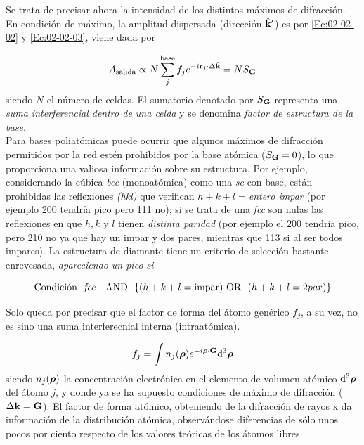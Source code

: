 Se trata de precisar ahora la intensidad de los distintos máximos de difracción. En condición de máximo, la amplitud dispersada (dirección $\hat{\mathbf{k}}'$) es por \ref{Ec:02-02-02} y \ref{Ec:02-02-03}, viene dada por 

\begin{equation}
    A_{\text{salida}} \propto N \sum_j^{\text{base}} f_j e^{-i\mathbf{r}_j \cdot \Delta \hat{\mathbf{k}}} = N S_{\mathbf{G}}
\end{equation}
siendo $N$ el número de celdas. El sumatorio denotado por $S_{\mathbf{G}}$ representa una \textit{suma interferencial dentro de una celda} y se denomina \textit{factor de estructura de la base}.  \\

Para bases poliatómicas puede ocurrir que algunos máximos de difracción permitidos por la red estén prohibidos por la base atómica ($S_{\mathbf{G}}=0$), lo que proporciona una valiosa información sobre su estructura. Por ejemplo, considerando la cúbica \textit{bcc} (monoatómica) como una \textit{sc} con base, están prohibidas las reflexiones \textit{(hkl)} que verifican $h+k+l=$\textit{entero impar} (por ejemplo 200 tendría pico pero 111 no); si se trata de una {\it fcc}  son nulas las reflexiones en que $h,k$ y $l$ tienen \textit{distinta paridad} (por ejemplo el 200 tendría pico, pero 210 no ya que hay un impar y dos pares, mientras que 113 si al ser todos impares). La estructura de diamante tiene un criterio de selección bastante enrevesada, \textit{apareciendo un pico si}

\begin{equation*}
 \text{Condición \ \textit{fcc}\ \ \ AND} \ \ \{ (h+k+l=\text{impar}) \text{\ OR \ } (h+k+l=2 par) \}
\end{equation*}

Solo queda por precisar que el factor de forma del átomo genérico $f_j$, a su vez, no es sino una suma interferecnial interna (intraatómica). \

\begin{equation}
    f_j = \int n_j (\boldsymbol{\rho}) e^{-i \boldsymbol{\rho} \cdot \mathbf{G}} \mathrm{d}^3 \boldsymbol{\rho}
\end{equation}
siendo $n_j (\boldsymbol{\rho})$ la concentración electrónica en el elemento de volumen atómico $\mathrm{d}^3 \boldsymbol{\rho}$ del átomo $j$, y donde ya se ha supuesto condiciones de máximo de difracción ($\Delta \mathbf{k}  = \mathbf{G}$). El factor de forma atómico, obteniendo de la difracción de rayos x da información de la distribución atómica, observándose diferencias de sólo unos pocos por ciento respecto de los valores teóricas de los átomos libres.


